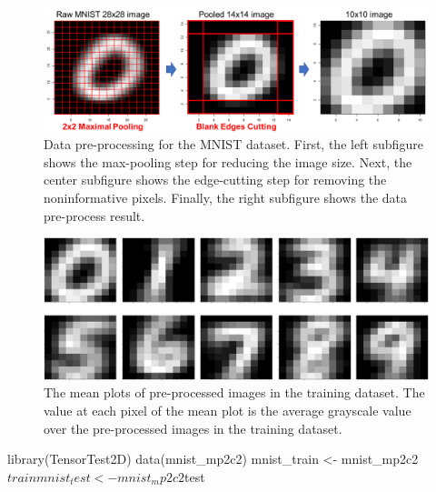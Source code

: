 \begin{Schunk}
\begin{figure}

{\centering \includegraphics[width=0.95\linewidth]{chen-chang-chen-tzeng-chang_files/figure-latex/mnist_preproc} 

}

\caption[Data pre-processing for the MNIST dataset]{Data pre-processing for the MNIST dataset. First, the left subfigure shows the max-pooling step for reducing the image size. Next, the center subfigure shows the edge-cutting step for removing the noninformative pixels. Finally, the right subfigure shows the data pre-process result.}\label{fig:mnistpreproc}
\end{figure}
\end{Schunk}

\begin{Schunk}
\begin{figure}

{\centering \includegraphics[width=0.95\linewidth]{chen-chang-chen-tzeng-chang_files/figure-latex/mnist_preproc_out} 

}

\caption[The mean plots of pre-processed images in the training dataset]{The mean plots of pre-processed images in the training dataset. The value at each pixel of the mean plot is the average grayscale value over the pre-processed images in the training dataset.}\label{fig:mnistmean}
\end{figure}
\end{Schunk}

\begin{Schunk}
\begin{Sinput}
library(TensorTest2D)
data(mnist_mp2c2)
mnist_train <- mnist_mp2c2$train
mnist_test <- mnist_mp2c2$test
\end{Sinput}
\end{Schunk}

